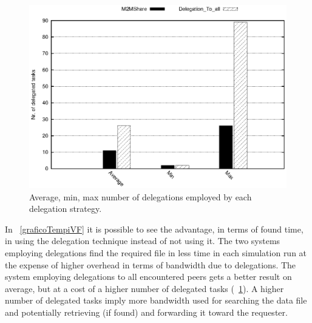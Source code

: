 \begin{figure}[!htbp]
\centering
\includegraphics{grafici/delegheFatte.eps}
\caption{Average, min, max number of delegations employed by each delegation strategy.}
\label{graficoNumeroDeleghe}
\end{figure}



In \figurename~\ref{graficoTempiVF} it is possible to see the advantage, in terms of found time, in using the delegation technique instead of not using it. The two systems employing delegations find the required file in less time in each simulation run at the expense of higher overhead in terms of bandwidth due to delegations. The system employing delegations to all encountered peers gets a better result on average, but at a cost of a higher number of delegated tasks (\figurename~\ref{graficoNumeroDeleghe}). A higher number of delegated tasks imply more bandwidth used for searching the data file and potentially retrieving (if found) and forwarding it toward the requester.
\\

